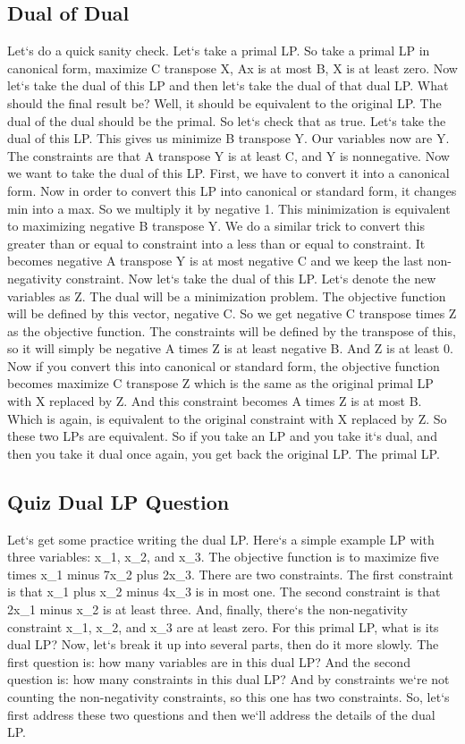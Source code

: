 \subsection{Dual of Dual}
Let`s do a quick sanity check.
Let`s take a primal LP\@.
So take a primal LP in canonical form, maximize C transpose X, Ax is at most B, X is at least zero.
Now let`s take the dual of this LP and then let`s take the dual of that dual LP\@.
What should the final result be? Well, it should be equivalent to the original LP\@.
The dual of the dual should be the primal.
So let`s check that as true.
Let`s take the dual of this LP\@.
This gives us minimize B transpose Y\@.
Our variables now are Y\@.
The constraints are that A transpose Y is at least C, and Y is nonnegative.
Now we want to take the dual of this LP\@.
First, we have to convert it into a canonical form.
Now in order to convert this LP into canonical or standard form, it changes min into a max.
So we multiply it by negative 1.
This minimization is equivalent to maximizing negative B transpose Y\@.
We do a similar trick to convert this greater than or equal to constraint into a less than or equal to constraint.
It becomes negative A transpose Y is at most negative C and we keep the last non-negativity constraint.
Now let`s take the dual of this LP\@.
Let`s denote the new variables as Z\@.
The dual will be a minimization problem.
The objective function will be defined by this vector, negative C\@.
So we get negative C transpose times Z as the objective function.
The constraints will be defined by the transpose of this, so it will simply be negative A times Z is at least negative B\@.
And Z is at least 0.
Now if you convert this into canonical or standard form, the objective function becomes maximize C transpose Z which is the same as the original primal LP with X replaced by Z\@.
And this constraint becomes A times Z is at most B\@.
Which is again, is equivalent to the original constraint with X replaced by Z\@.
So these two LPs are equivalent.
So if you take an LP and you take it`s dual, and then you take it dual once again, you get back the original LP\@.
The primal LP\@.

\subsection{Quiz  Dual LP Question}
Let`s get some practice writing the dual LP\@.
Here`s a simple example LP with three variables: x\_1, x\_2, and x\_3.
The objective function is to maximize five times x\_1 minus 7x\_2 plus 2x\_3.
There are two constraints.
The first constraint is that x\_1 plus x\_2 minus 4x\_3 is in most one.
The second constraint is that 2x\_1 minus x\_2 is at least three.
And, finally, there`s the non-negativity constraint x\_1, x\_2, and x\_3 are at least zero.
For this primal LP, what is its dual LP? Now, let`s break it up into several parts, then do it more slowly.
The first question is: how many variables are in this dual LP? And the second question is: how many constraints in this dual LP? And by constraints we`re not counting the non-negativity constraints, so this one has two constraints.
So, let`s first address these two questions and then we`ll address the details of the dual LP\@.

